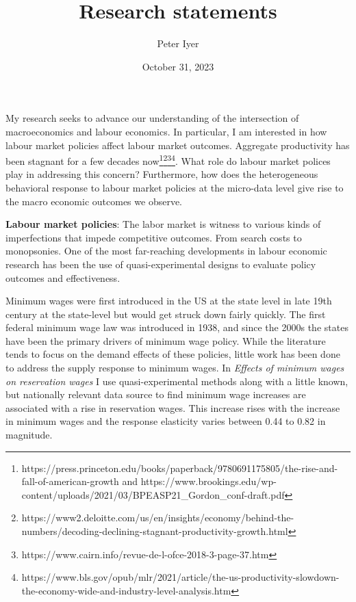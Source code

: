 \documentclass[
]{article}
\title{Research statements}
\author{Peter Iyer}
\date{October 31, 2023}
\begin{document}
\maketitle

My research seeks to advance our understanding of the intersection of
macroeconomics and labour economics. In particular, I am interested in
how labour market policies affect labour market outcomes. Aggregate
productivity has been stagnant for a few decades
now\footnote{https://press.princeton.edu/books/paperback/9780691175805/the-rise-and-fall-of-american-growth
  and
  https://www.brookings.edu/wp-content/uploads/2021/03/BPEASP21\_Gordon\_conf-draft.pdf}\footnote{https://www2.deloitte.com/us/en/insights/economy/behind-the-numbers/decoding-declining-stagnant-productivity-growth.html}\footnote{https://www.cairn.info/revue-de-l-ofce-2018-3-page-37.htm}\footnote{https://www.bls.gov/opub/mlr/2021/article/the-us-productivity-slowdown-the-economy-wide-and-industry-level-analysis.htm}.
What role do labour market polices play in addressing this concern?
Furthermore, how does the heterogeneous behavioral response to labour
market policies at the micro-data level give rise to the macro economic
outcomes we observe.

\textbf{Labour market policies}: The labor market is witness to various
kinds of imperfections that impede competitive outcomes. From search
costs to monopsonies. One of the most far-reaching developments in
labour economic research has been the use of quasi-experimental designs
to evaluate policy outcomes and effectiveness.

Minimum wages were first introduced in the US at the state level in late
19th century at the state-level but would get struck down fairly
quickly. The first federal minimum wage law was introduced in 1938, and
since the 2000s the states have been the primary drivers of minimum wage
policy. While the literature tends to focus on the demand effects of
these policies, little work has been done to address the supply response
to minimum wages. In \emph{Effects of minimum wages on reservation
wages} I use quasi-experimental methods along with a little known, but
nationally relevant data source to find minimum wage increases are
associated with a rise in reservation wages. This increase rises with
the increase in minimum wages and the response elasticity varies between
0.44 to 0.82 in magnitude.
\end{document}
